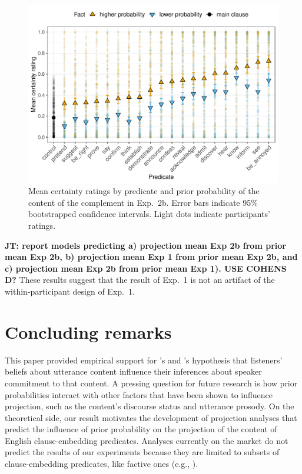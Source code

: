 \documentclass[11pt,fleqn]{article}
\newcommand{\jt}[1]{\textbf{\color{blue}JT: #1}}
\newcommand{\6}{\mbox{$[\hspace*{-.6mm}[$}}
\newcommand{\9}{\mbox{$]\hspace*{-.6mm}]$}}
\newcommand{\citetpos}[1]{\citeauthor{#1}'s \citeyear{#1}}
\begin{document}
\begin{figure}[h!]
\centering

\includegraphics[width=.7\paperwidth]{../../results/3-projectivity/graphs/means-projectivity-by-predicate-and-prior}

\caption{Mean certainty ratings by predicate and prior probability of the content of the complement in Exp.~2b. Error bars indicate 95\% bootstrapped confidence intervals. Light dots indicate participants' ratings.} 
\label{f-projection-mean-2b}
\end{figure}


\jt{report models predicting a) projection mean Exp 2b from prior mean Exp 2b, b) projection mean Exp 1 from prior mean Exp 2b, and c) projection mean Exp 2b from prior mean Exp 1). USE COHENS D?} These results suggest that the result of Exp.~1 is not an artifact of the within-participant design of Exp.~1.

\section{Concluding remarks}\label{s4}

This paper provided empirical support for \citetpos{stevens-etal2017} and \citetpos{tbd-variability} hypothesis that listeners' beliefs about utterance content influence their inferences about speaker commitment to that content. A pressing question for future research is how prior probabilities interact with other factors that have been shown to influence projection, such as the content's discourse status and utterance prosody. On the theoretical side, our result motivates the development of projection analyses that predict the influence of prior probability on the projection of the content of English clause-embedding predicates. Analyses currently on the market do not predict the results of our experiments  because they are limited to subsets of clause-embedding predicates, like factive ones (e.g., ).
\end{document}
